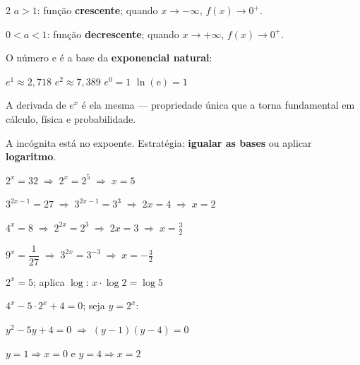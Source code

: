 \documentclass[12pt]{article}
\begin{document}
\begin{multicols}{2}
$a > 1$: função \textbf{crescente}; quando $x \to -\infty$, $f(x) \to 0^+$.

$0 < a < 1$: função \textbf{decrescente}; quando $x \to +\infty$, $f(x) \to 0^+$.


O número $\mathrm{e}$ é a base da \textbf{exponencial natural}:


$e^1 \approx 2{,}718$ \quad $e^2 \approx 7{,}389$ \quad $e^0 = 1$ \quad $\ln(\mathrm{e}) = 1$

A derivada de $e^x$ é ela mesma — propriedade única que a torna fundamental em cálculo,
física e probabilidade.


A incógnita está no expoente. Estratégia: \textbf{igualar as bases} ou aplicar
\textbf{logaritmo}.


$2^x = 32 \;\Rightarrow\; 2^x = 2^5 \;\Rightarrow\; \boxed{x = 5}$

$3^{2x-1} = 27 \;\Rightarrow\; 3^{2x-1} = 3^3 \;\Rightarrow\; 2x = 4 \;\Rightarrow\; \boxed{x = 2}$

$4^x = 8 \;\Rightarrow\; 2^{2x} = 2^3 \;\Rightarrow\; 2x = 3 \;\Rightarrow\; \boxed{x = \tfrac{3}{2}}$

$9^x = \dfrac{1}{27} \;\Rightarrow\; 3^{2x} = 3^{-3} \;\Rightarrow\; \boxed{x = -\tfrac{3}{2}}$


$2^x = 5$; aplica $\log$: $x \cdot \log 2 = \log 5$



$4^x - 5 \cdot 2^x + 4 = 0$; seja $y = 2^x$:

$y^2 - 5y + 4 = 0 \;\Rightarrow\; (y-1)(y-4) = 0$

$y = 1 \Rightarrow x = 0$ \quad e \quad $y = 4 \Rightarrow x = 2$



\end{multicols}
\end{document}
